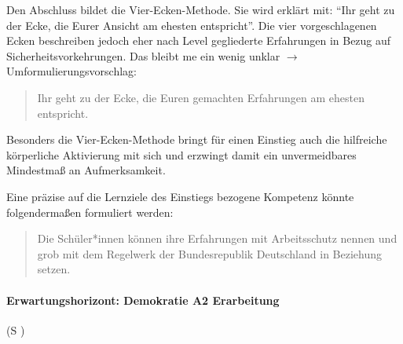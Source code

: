 Den Abschluss bildet die Vier-Ecken-Methode. Sie wird erklärt mit: \enquote{Ihr geht zu der Ecke, die Eurer Ansicht am ehesten entspricht}.
Die vier vorgeschlagenen Ecken beschreiben jedoch eher nach Level gegliederte Erfahrungen in Bezug auf Sicherheitsvorkehrungen. Das bleibt \gls{me} ein wenig unklar $\rightarrow$ Umformulierungsvorschlag:
\begin{quote}
    Ihr geht zu der Ecke, die Euren gemachten Erfahrungen am ehesten entspricht. 
\end{quote}

Besonders die Vier-Ecken-Methode bringt für einen Einstieg auch die hilfreiche körperliche Aktivierung mit sich und erzwingt damit ein unvermeidbares Mindestmaß an Aufmerksamkeit.  

Eine präzise auf die Lernziele des Einstiegs bezogene Kompetenz könnte folgendermaßen formuliert werden:
\begin{quote}
    Die Schüler*innen können ihre Erfahrungen mit Arbeitsschutz nennen und grob mit dem Regelwerk der Bundesrepublik Deutschland in Beziehung setzen. 
\end{quote}



\paragraph{Erwartungshorizont: Demokratie A2 Erarbeitung} (\gls{S} \pageref{DEMOKRATIE-A2})

